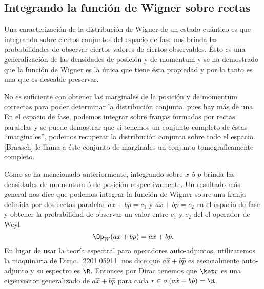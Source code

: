   \subsection{Integrando la función de Wigner sobre rectas}

  Una caracterización de la distribución de Wigner de un
  estado cuántico es que integrando sobre ciertos conjuntos
  del espacio de fase nos brinda las probabilidades de
  observar ciertos valores de ciertos observables. Ésto es
  una generalización de las densidades de posición y de
  momentum y se ha demostrado que la función de Wigner es la
  única que tiene ésta propiedad y por lo tanto es una que
  es deseable preservar.

  No es suficiente con obtener las marginales de la posición
  y de momentum correctas para poder determinar la
  distribución conjunta, pues hay más de una. En el espacio
  de fase, podemos integrar sobre franjas formadas por
  rectas paralelas y se puede demostrar que si tenemos un
  conjunto completo de éstas ``marginales'', podemos
  recuperar la distribución conjunta sobre todo el espacio.
  [Braasch] le llama a éste conjunto de marginales un
  conjunto tomograficamente completo.

  Como se ha mencionado anteriormente, integrando sobre $x$
  ó $p$ brinda las densidades de momentum ó de posición
  respectivamente. Un resultado más general nos dice que
  podemos integrar la función de Wigner sobre una franja
  definida por dos rectas paralelas $ax + bp = c_1$ y $ax +
  bp = c_2$ en el espacio de fase y obtener la probabilidad
  de observar un valor entre $c_1$ y $c_2$ del el operador
  de Weyl
  \[
    \Op_W(ax+bp) = a \hat{x} + b \hat{p}.
  \] 
  En lugar de usar la teoría espectral para operadores
  auto-adjuntos, utilizaremos la maquinaria de Dirac.
  [2201.05911] nos dice que $a \hat{x} + b \hat{p}$ es
  esencialmente auto-adjunto y su espectro es $\R$. Entonces
  por Dirac tenemos que $\ket r$ es una eigenvector
  generalizado de $a \hat{x} + b \hat{p}$ para cada $r \in
  \sigma\left( a \hat{x} + b \hat{p} \right) = \R$. 


